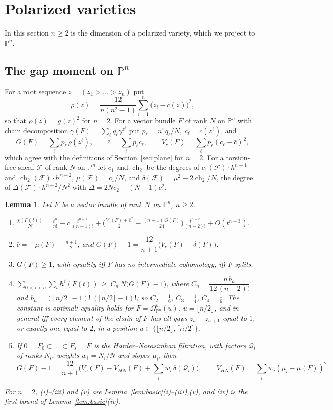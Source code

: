 \documentclass[11pt]{amsart}
\newtheorem{lemma}[theorem]{Lemma}
\theoremstyle{definition}
\theoremstyle{remark}
\newcommand{\PP}{\mathbb{P}}
\newcommand{\cF}{\mathcal{F}}
\newcommand{\cQ}{\mathcal{Q}}
\begin{document}
\section{Polarized varieties}\label{sec:polarized}

In this section $n\ge2$ is the dimension of a polarized variety, which we project to $\PP^n$.

\subsection{The gap moment on \texorpdfstring{$\PP^n$}{Pn}}
For a root sequence $z=(z_1>\dots>z_n)$ put
\[
\rho(z)=\frac{12}{n(n^2-1)}\sum_{i=1}^n\big(z_i-c(z)\big)^2 ,
\]
so that $\rho(z)=g(z)^2$ for $n=2$. For a vector bundle $F$ of rank $N$ on $\PP^n$ with chain decomposition $\gamma(F)=\sum_\ell q_\ell\gamma^{z^\ell}$ put $p_\ell=n!\,q_\ell/N$, $c_\ell=c(z^\ell)$, and
\[
G(F)=\sum_\ell p_\ell\,\rho(z^\ell),\qquad \bar c=\sum_\ell p_\ell c_\ell,\qquad V_c(F)=\sum_\ell p_\ell(c_\ell-\bar c)^2 ,
\]
which agree with the definitions of Section~\ref{sec:plane} for $n=2$. For a torsion-free sheaf $\cF$ of rank $N$ on $\PP^n$ let $c_1$ and $\operatorname{ch}_2$ be the degrees of $c_1(\cF)\cdot h^{n-1}$ and $\operatorname{ch}_2(\cF)\cdot h^{n-2}$, $\mu(\cF)=c_1/N$, and $\delta(\cF)=\mu^2-2\operatorname{ch}_2/N$, the degree of $\Delta(\cF)\cdot h^{n-2}/N^2$ with $\Delta=2Nc_2-(N-1)c_1^2$.

\begin{lemma}\label{lem:gapPn}
Let $F$ be a vector bundle of rank $N$ on $\PP^n$, $n\ge2$.
\begin{enumerate}[label=\textup{(\roman*)}]
\item $\displaystyle\frac{\chi(F(t))}N=\frac{t^n}{n!}-\bar c\,\frac{t^{n-1}}{(n-1)!}+\Big(\frac{V_c(F)+\bar c^{\,2}}2-\frac{(n+1)\,G(F)}{24}\Big)\frac{t^{n-2}}{(n-2)!}+O(t^{n-3})$.
\item $\bar c=-\mu(F)-\frac{n+1}2$, and $G(F)-1=\dfrac{12}{n+1}\big(V_c(F)+\delta(F)\big)$.
\item $G(F)\ge1$, with equality iff $F$ has no intermediate cohomology, iff $F$ splits.
\item $\displaystyle\sum_{0<i<n}\sum_th^i(F(t))\ \ge\ C_n\,N\big(G(F)-1\big)$, where $C_n=\dfrac{n\,b_n}{12\,(n-2)!}$ and $b_n=(\lfloor n/2\rfloor-1)!\,(\lceil n/2\rceil-1)!$; so $C_2=\frac16$, $C_3=\frac14$, $C_4=\frac16$. The constant is optimal: equality holds for $F=\Omega^u_{\PP^n}(u)$, $u=\lfloor n/2\rfloor$, and in general iff every element of the chain of $F$ has all gaps $z_u-z_{u+1}$ equal to $1$, or exactly one equal to $2$, in a position $u\in\{\lfloor n/2\rfloor,\lceil n/2\rceil\}$.
\item If $0=F_0\subset\dots\subset F_s=F$ is the Harder--Narasimhan filtration, with factors $\cQ_i$ of ranks $N_i$, weights $w_i=N_i/N$ and slopes $\mu_i$, then
\[
G(F)-1=\frac{12}{n+1}\Big(V_c(F)-V_{HN}(F)+\sum_iw_i\,\delta(\cQ_i)\Big),\qquad V_{HN}(F)=\sum_iw_i(\mu_i-\mu(F))^2 .
\]
\end{enumerate}
For $n=2$, (i)--(iii) and (v) are Lemma~\ref{lem:basic}(i)--(iii),(v), and (iv) is the first bound of Lemma~\ref{lem:basic}(iv).
\end{lemma}
\end{document}
